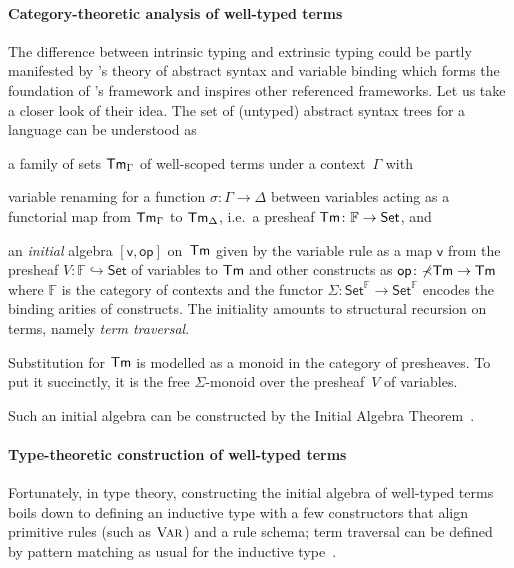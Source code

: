 \documentclass[BiSig.tex]{subfiles}
\begin{document}
\paragraph{Category-theoretic analysis of well-typed terms}
The difference between intrinsic typing and extrinsic typing could be partly manifested by \citet{Fiore1999}{'s} theory of abstract syntax and variable binding which forms the foundation of \citet{Fiore2022}'s framework and inspires other referenced frameworks.
Let us take a closer look of their idea.
The set of (untyped) abstract syntax trees for a language can be understood as
\begin{enumerate*}
  \item a family of sets $\mathsf{Tm}_{\Gamma}$ of well-scoped terms under a context~$\Gamma$ with
  \item variable renaming for a function $\sigma\colon \Gamma \to \Delta$ between variables acting as a functorial map from $\mathsf{Tm}_{\Gamma}$ to $\mathsf{Tm}_{\Delta}$, i.e.\ a presheaf $\mathsf{Tm}\colon \mathbb{F} \to \mathsf{Set}$, and
  \item an \emph{initial} algebra $[\mathsf{v}, \mathsf{op}]$ on~$\mathsf{Tm}$ given by the variable rule as a map $\mathsf{v}$ from the presheaf $V\colon \mathbb{F} \hookrightarrow \mathsf{Set}$ of variables to $\mathsf{Tm}$ and other constructs as $\mathsf{op}\colon \mathbb{\Sigma}\mathsf{Tm} \to \mathsf{Tm}$ where $\mathbb{F}$ is the category of contexts and the functor $\mathbb{\Sigma}\colon \mathsf{Set}^\mathbb{F} \to \mathsf{Set}^\mathbb{F}$ encodes the binding arities of constructs. 
  The initiality amounts to structural recursion on terms, namely \emph{term traversal}.
\end{enumerate*}
Substitution for $\mathsf{Tm}$ is modelled as a monoid in the category of presheaves.
To put it succinctly, it is the free $\mathbb{\Sigma}$-monoid over the presheaf~$V$ of variables.

Such an initial algebra can be constructed by the Initial Algebra Theorem~\cite{Trnkova1975}.

\paragraph{Type-theoretic construction of well-typed terms}
Fortunately, in type theory, constructing the initial algebra of well-typed terms boils down to defining an inductive type with a few constructors that align primitive rules (such as $\textnormal{\textsc{Var}}$) and a rule schema; term traversal can be defined by pattern matching as usual for the inductive type~\citep{Fiore2022}.
\end{document}
